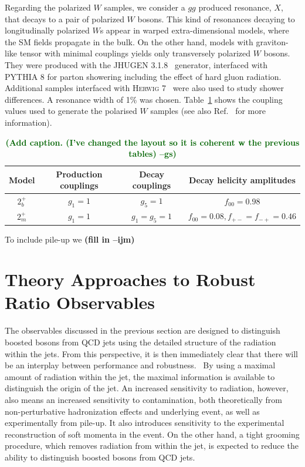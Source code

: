 \documentclass[11pt,letterpaper]{article}
\DeclareRobustCommand{\Ref}[1]{Ref.~\cite{#1}}
\newcommand{\ijm}[1]{\textbf{\textcolor{llblue}{(#1 --ijm)}}}
\newcommand{\gs}[1]{\textbf{\textcolor{darkgreen}{(#1 --gs)}}}
\begin{document}
Regarding the polarized $W$ samples, we consider a $gg$ produced resonance, $X$, that decays to a pair of polarized $W$ bosons.
%
This kind of resonances decaying to longitudinally polarized $W$s appear in warped extra-dimensional models, where the SM fields propagate in the bulk.
%
On the other hand, models with graviton-like tensor with minimal couplings yields only transversely polarized $W$ bosons.
%
They were produced with the \textsc{JHUGEN} 3.1.8~\cite{Gao:2010qx,Bolognesi:2012mm} generator, interfaced with \textsc{PYTHIA} 8 \cite{Sjostrand:2007gs} for parton showering including the effect of hard gluon radiation.
%
Additional samples interfaced with \textsc{Herwig} 7~\cite{Bahr:2008pv,Bellm:2015jjp} were also used to study shower differences.
%
A resonance width of 1\% was chosen.
%
Table~\ref{table:polarisedSamples} shows the coupling values used to generate the polarised $W$ samples (see also \Ref{Gao:2010qx} for more information). 

\begin{table}[ht]
\centering
\begin{tabular}{|c|c|c|c|}
\hline
Model	&Production couplings	&Decay couplings	&Decay helicity amplitudes 	\\
\hline
$2_b^+$	& $g_1=1$		& $g_5=1$		& $f_{00}=0.98$			\\
$2_m^+$	& $g_1=1$		& $g_1=g_5=1$		& $f_{00}=0.08,f_{+-}=f_{-+}=0.46$\\	
\hline
\end{tabular}
\caption{\gs{Add caption. (I've changed the layout so it is coherent w
  the previous tables)}}
\label{table:polarisedSamples}
\end{table}

To include pile-up we \ijm{fill in}





\section{Theory Approaches to Robust Ratio Observables}\label{sec:hybrid_ratio}

The observables discussed in the previous section are designed to
distinguish boosted bosons from QCD jets using the detailed structure
of the radiation within the jets.
%
From this perspective, it is then
immediately clear that there will be an interplay between performance
and robustness.\
%
By using a maximal amount of radiation within the jet,
the maximal information is available to distinguish the origin of the
jet.
%
An increased sensitivity to radiation, however, also means an
increased sensitivity to contamination, both theoretically from
non-perturbative hadronization effects and underlying event, as well
as experimentally from pile-up.
%
It also introduces sensitivity to the
experimental reconstruction of soft momenta in the event.
%
On the other
hand, a tight grooming procedure, which removes radiation from within
the jet, is expected to reduce the ability to distinguish boosted
bosons from QCD jets.
\end{document}

